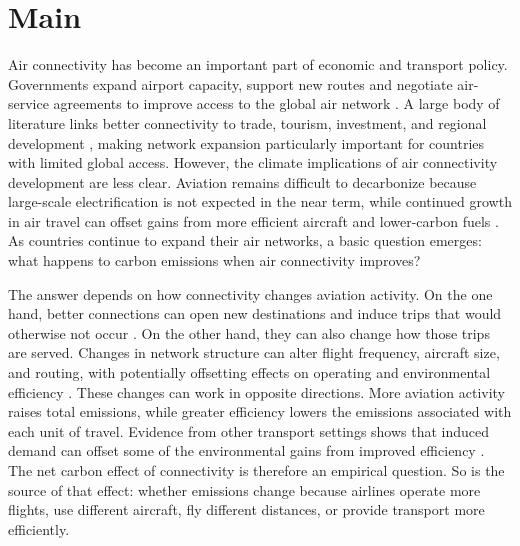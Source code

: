 \documentclass[12pt]{article}
\begin{document}
\section*{Main}
Air connectivity has become an important part of economic and transport
policy. Governments expand airport capacity, support new routes and
negotiate air-service agreements to improve access to the global air
network \citep{fageda2018,piermartini2013}. A large body of literature
links better connectivity to trade, tourism, investment, and regional
development \citep{lenaerts2021,zhang2020}, making network expansion
particularly important for countries with limited global access. However,
the climate implications of air connectivity development are less clear.
Aviation remains difficult to decarbonize because large-scale
electrification is not expected in the near term, while continued growth
in air travel can offset gains from more efficient aircraft and
lower-carbon fuels \citep{bergero2023,sacchi2023}. As countries continue
to expand their air networks, a basic question emerges: what happens to
carbon emissions when air connectivity improves?

The answer depends on how connectivity changes aviation activity. On the
one hand, better connections can open new destinations and induce trips
that would otherwise not occur \citep{koo2017,piermartini2013}. On the
other hand, they can also change how those trips are served. Changes in
network structure can alter flight frequency, aircraft size, and routing,
with potentially offsetting effects on operating and environmental
efficiency \citep{brueckner2004,pels2021}. These changes can work in
opposite directions. More aviation activity raises total emissions, while
greater efficiency lowers the emissions associated with each unit of
travel. Evidence from other transport settings shows that induced demand
can offset some of the environmental gains from improved efficiency
\citep{hymel2010,ou2024}. The net carbon effect of connectivity is
therefore an empirical question. So is the source of that effect: whether
emissions change because airlines operate more flights, use different
aircraft, fly different distances, or provide transport more efficiently.
\end{document}
